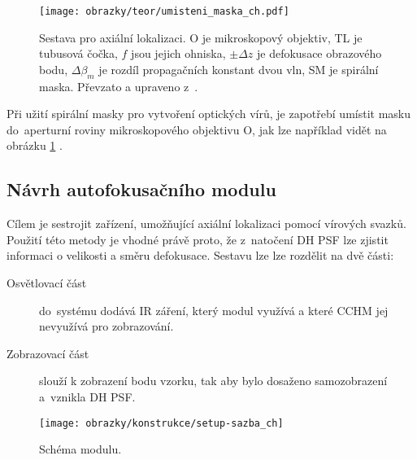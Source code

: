 \documentclass[12pt, a4paper, twoside]{article}
\begin{document}
\begin{figure}[h]
  \centering
  \texttt{[image: obrazky/teor/umisteni\_maska\_ch.pdf]}
  \caption[Sestava pro axiální lokalizaci.]{Sestava pro axiální lokalizaci. O je mikroskopový objektiv, TL je tubusová čočka, $f$ jsou jejich ohniska, $\pm\Delta z$ je defokusace obrazového bodu, $ \Delta\beta_m$ je rozdíl propagačních konstant dvou vln, SM je spirální maska. Převzato a upraveno z~\cite{oe-2015}.}
  \label{fig:ax_loc_setup}
\end{figure}

Při užití spirální masky pro vytvoření optických vírů, je zapotřebí umístit masku do~aperturní roviny mikroskopového objektivu O, jak lze například vidět na obrázku \ref{fig:ax_loc_setup} \cite{oe-2015}.

\subsection*{Návrh autofokusačního modulu}

Cílem je sestrojit zařízení, umožňující axiální lokalizaci pomocí vírových svazků. Použití této metody je vhodné právě proto, že z~natočení DH PSF lze zjistit informaci o velikosti a směru defokusace. Sestavu lze lze rozdělit na dvě části:
\begin{description}
  \item[Osvětlovací část] do~systému dodává IR záření, který modul využívá a které CCHM jej nevyužívá pro zobrazování.
  \item[Zobrazovací část] slouží k zobrazení bodu vzorku, tak aby bylo dosaženo samozobrazení a~vznikla DH PSF.
\end{description}

\begin{figure}
  \centering
  \texttt{[image: obrazky/konstrukce/setup-sazba\_ch]}
  \caption[Schéma modulu]{
Schéma modulu.    
}
  \label{fig:setup}
\end{figure}
\end{document}
